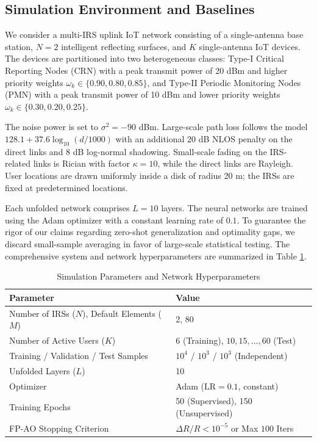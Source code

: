 \documentclass[journal]{IEEEtran}
\begin{document}
\subsection{Simulation Environment and Baselines}
\label{subsec:sim_setup}

We consider a multi-IRS uplink IoT network consisting of a single-antenna base station, $N=2$ intelligent reflecting surfaces, and $K$ single-antenna IoT devices. The devices are partitioned into two heterogeneous classes: Type-I Critical Reporting Nodes (CRN) with a peak transmit power of 20 dBm and higher priority weights $\omega_k \in \{0.90, 0.80, 0.85\}$, and Type-II Periodic Monitoring Nodes (PMN) with a peak transmit power of 10 dBm and lower priority weights $\omega_k \in \{0.30, 0.20, 0.25\}$. 

The noise power is set to $\sigma^2 = -90$ dBm. Large-scale path loss follows the model $128.1 + 37.6 \log_{10}(d/1000)$ with an additional 20 dB NLOS penalty on the direct links and 8 dB log-normal shadowing. Small-scale fading on the IRS-related links is Rician with factor $\kappa = 10$, while the direct links are Rayleigh. User locations are drawn uniformly inside a disk of radius 20 m; the IRSs are fixed at predetermined locations. 

Each unfolded network comprises $L=10$ layers. The neural networks are trained using the Adam optimizer with a constant learning rate of $0.1$. To guarantee the rigor of our claims regarding zero-shot generalization and optimality gaps, we discard small-sample averaging in favor of large-scale statistical testing. The comprehensive system and network hyperparameters are summarized in Table \ref{tab:sim_parameters}.

\begin{table}[ht]
\centering
\caption{Simulation Parameters and Network Hyperparameters}
\label{tab:sim_parameters}
\begin{tabular}{@{}ll@{}}
\toprule
\textbf{Parameter} & \textbf{Value} \\ \midrule
Number of IRSs ($N$), Default Elements ($M$) & 2, 80 \\
Number of Active Users ($K$) & 6 (Training), $10, 15, \dots, 60$ (Test) \\
Training / Validation / Test Samples & $10^4$ / $10^3$ / $10^3$ (Independent) \\
Unfolded Layers ($L$) & 10 \\
Optimizer & Adam ($\text{LR} = 0.1$, constant) \\
Training Epochs & 50 (Supervised), 150 (Unsupervised) \\
FP-AO Stopping Criterion & $\Delta R / R < 10^{-5}$ or Max $100$ Iters \\
\bottomrule
\end{tabular}
\end{table}
\end{document}
